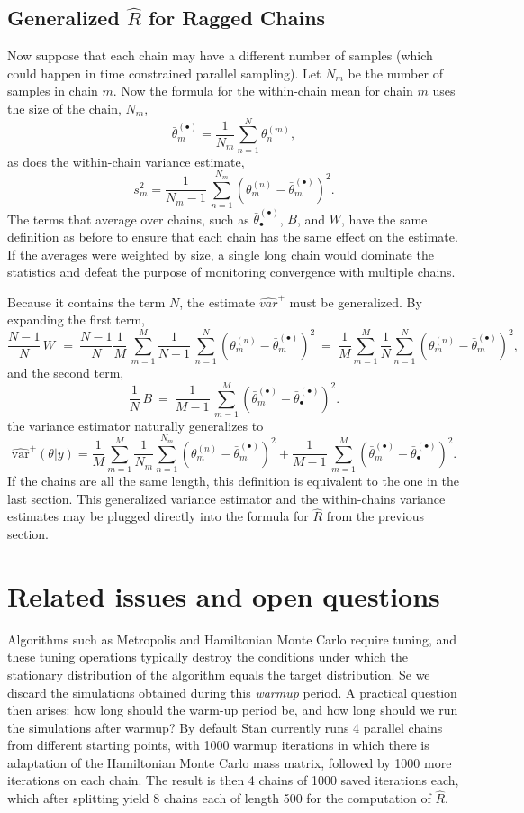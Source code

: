 \documentclass[11pt]{article}
\begin{document}
\subsection{Generalized $\hat{R}$ for Ragged Chains}

Now suppose that each chain may have a different number of samples (which could happen in time constrained parallel sampling).
Let $N_m$ be the number of samples in chain $m$.  Now the formula for
the within-chain mean for chain $m$ uses the size of the chain, $N_m$,
\[
\bar{\theta}_m^{(\bullet)}
= \frac{1}{N_m} \sum_{n = 1}^N \theta^{(m)}_n,
\]
as does the within-chain variance estimate,
\[
s_m^2 = \frac{1}{N_m-1} \, \sum_{n=1}^{N_m} (\theta^{(n)}_m - \bar{\theta}^{(\bullet)}_m)^2.
\]
The terms that average over chains, such as
$\bar{\theta}^{(\bullet)}_{\bullet}$, $B$, and $W$, have the same
definition as before to ensure that each chain has the same effect on
the estimate.  If the averages were weighted by size, a single long
chain would dominate the statistics and defeat the purpose of
monitoring convergence with multiple chains.

Because it contains the term $N$, the estimate $\widehat{var}^{+}$
must be generalized.  By expanding the first term,
\[
\frac{N-1}{N}\, W \,
\ = \
\frac{N-1}{N} \frac{1}{M} \, \sum_{m=1}^M
\frac{1}{N-1} \, \sum_{n=1}^N (\theta^{(n)}_m -
\bar{\theta}^{(\bullet)}_m)^2
\ = \
\frac{1}{M}
\sum_{m=1}^M
\frac{1}{N}
\sum_{n=1}^N (\theta^{(n)}_m -
\bar{\theta}^{(\bullet)}_m)^2,
\]
and the second term,
\[
\frac{1}{N}\, B
\ = \
\frac{1}{M-1} \, \sum_{m=1}^M (\bar{\theta}^{(\bullet)}_{m} - \bar{\theta}^{(\bullet)}_{\bullet})^2.
\]
the variance estimator naturally generalizes to
\[
\widehat{\mbox{var}}^{+}\!(\theta|y)
=
\frac{1}{M}
\sum_{m=1}^M
\frac{1}{N_m}
\sum_{n=1}^{N_m} (\theta^{(n)}_m -
\bar{\theta}^{(\bullet)}_m)^2
+
\frac{1}{M-1} \, \sum_{m=1}^M (\bar{\theta}^{(\bullet)}_{m} -
\bar{\theta}^{(\bullet)}_{\bullet})^2.
\]
%
If the chains are all the same length, this definition is equivalent
to the one in the last section.  This generalized variance estimator
and the within-chains variance estimates may be plugged directly into
the formula for $\hat{R}$ from the previous section.

\section{Related issues and open questions}

\label{warmup}Algorithms such as Metropolis and Hamiltonian Monte Carlo require tuning, and these tuning operations typically destroy the conditions under which the stationary distribution of the algorithm equals the target distribution.  Se we discard the simulations obtained during this {\em warmup} period.  A practical question then arises:  how long should the warm-up period be, and how long should we run the simulations after warmup?  By default Stan currently runs 4 parallel chains from different starting points, with 1000 warmup iterations in which there is adaptation of the Hamiltonian Monte Carlo mass matrix, followed by 1000 more iterations on each chain.  The result is then 4 chains of 1000 saved iterations each, which after splitting yield 8 chains each of length 500 for the computation of $\widehat{R}$.
\end{document}
